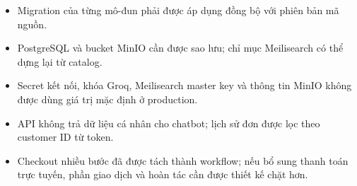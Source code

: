 \enlargethispage{2\baselineskip}
\begin{itemize}[leftmargin=2em, itemsep=4pt]
  \item Migration của từng mô-đun phải được áp dụng đồng bộ với phiên bản mã nguồn.
  \item PostgreSQL và bucket MinIO cần được sao lưu; chỉ mục Meilisearch có thể dựng lại từ catalog.
  \item Secret kết nối, khóa Groq, Meilisearch master key và thông tin MinIO không được dùng giá trị mặc định ở production.
  \item API không trả dữ liệu cá nhân cho chatbot; lịch sử đơn được lọc theo customer ID từ token.
  \item Checkout nhiều bước đã được tách thành workflow; nếu bổ sung thanh toán trực tuyến, phần giao dịch và hoàn tác cần được thiết kế chặt hơn.
\end{itemize}
